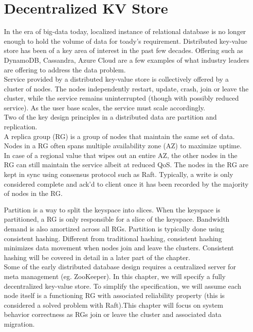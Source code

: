 % 

\usetikzlibrary{arrows.meta} %

\chapter{Decentralized KV Store}

In the era of big-data today, localized instance of relational database is no
longer enough to hold the volume of data for toady's requirement. Distributed
key-value store has been of a key area of interest in the past few decades. 
Offering such as DynamoDB, Cassandra, Azure Cloud are a few examples of what
industry leaders are offering to address the data problem.\\

Service provided by a distributed key-value store is collectively offered by a
cluster of nodes. The nodes independently restart, update, crash, join or leave 
the cluster, while the service remains uninterrupted (though with possibly
reduced service). As the user base scales, the service must scale accordingly.\\

Two of the key design principles in a distributed data are partition and
replication.\\

A replica group (RG) is a group of nodes that maintain the same set of data.
Nodes in a RG often spans multiple availability zone (AZ) to maximize uptime.
In case of a regional value that wipes out an entire AZ, the other nodes in the
RG can still maintain the service albeit at reduced QoS. The nodes in the RG are
kept in sync using consensus protocol such as Raft. Typically, a write is only
considered complete and ack'd to client once it has been recorded by the
majority of nodes in the RG.

Partition is a way to split the keyspace into slices. When the keyspace is
partitioned, a RG is only responsible for a slice of the keyspace. Bandwidth
demand is also amortized across all RGs. Partition is typically done using 
consistent hashing. Different from traditional hashing, consistent hashing
minimizes data movement when nodes join and leave the clusters. Consistent
hashing will be covered in detail in a later part of the chapter.\\

Some of the early distributed database design requires a centralized server for
meta management (eg. ZooKeeper). In this chapter, we will specify a fully
decentralized key-value store. To simplify the specification, we will assume 
each node itself is a functioning RG with associated reliability property (this
is considered a solved problem with Raft).This chapter will focus on system
behavior correctness as RGs join or leave the cluster and associated data
migration.

